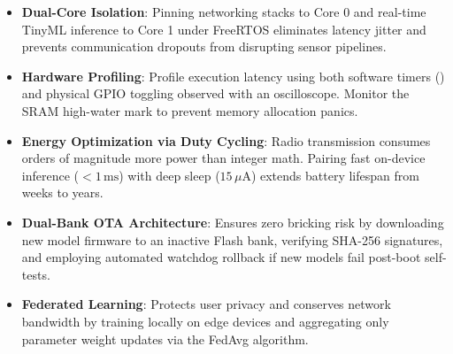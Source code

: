 \begin{takeaways}
\begin{itemize}
    \item \textbf{Dual-Core Isolation}: Pinning networking stacks to Core 0 and real-time TinyML inference to Core 1 under FreeRTOS eliminates latency jitter and prevents communication dropouts from disrupting sensor pipelines.
    \item \textbf{Hardware Profiling}: Profile execution latency using both software timers () and physical GPIO toggling observed with an oscilloscope. Monitor the SRAM high-water mark to prevent memory allocation panics.
    \item \textbf{Energy Optimization via Duty Cycling}: Radio transmission consumes orders of magnitude more power than integer math. Pairing fast on-device inference ($< 1\,\text{ms}$) with deep sleep ($15\,\mu\text{A}$) extends battery lifespan from weeks to years.
    \item \textbf{Dual-Bank OTA Architecture}: Ensures zero bricking risk by downloading new model firmware to an inactive Flash bank, verifying SHA-256 signatures, and employing automated watchdog rollback if new models fail post-boot self-tests.
    \item \textbf{Federated Learning}: Protects user privacy and conserves network bandwidth by training locally on edge devices and aggregating only parameter weight updates via the FedAvg algorithm.
\end{itemize}
\end{takeaways}

